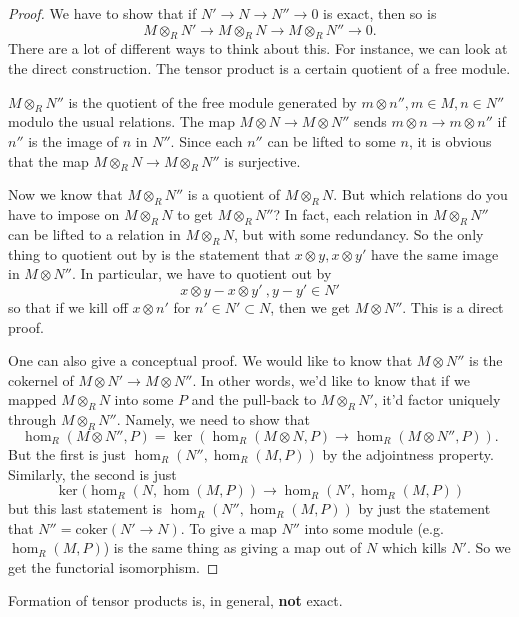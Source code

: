\begin{proof}
We have to show that if $N' \to N \to N'' \to 0$ is exact, then so is
\[ M \otimes_R N' \to M \otimes_R N \to M \otimes_R N'' \to 0.	\]
There are a lot of different ways to think about this. For instance, we can
look at the direct construction.  The tensor product is a certain quotient of a
free module.

$M \otimes_R N''$ is the quotient of the free module generated by $m \otimes
n'', m \in M, n \in N''$ modulo the usual relations.  The map $M \otimes N \to
M \otimes N''$ sends $m \otimes n \to m \otimes n''$ if $n'' $ is the image of
$n$ in $N''$. Since each $n''$ can be lifted to some $n$, it is obvious that
the map $M \otimes_R N \to M \otimes_R N''$ is surjective.

Now we know that $M \otimes_R N''$ is a quotient of $M \otimes_R N$. But which
relations do you have to impose on $M \otimes_R N$ to get $M \otimes_R
N''$? In fact, each relation in $M \otimes_R N''$
can be lifted to a relation in $M \otimes_R N$, but with some redundancy. So
the only thing to quotient
out by is the statement that $x \otimes y, x \otimes y'$ have the same image in
$M \otimes N''$.  In particular, we have to quotient out by
\[ x \otimes y - x\otimes y' \ , y - y' \in N'	 \]
so that if we kill off $x \otimes n'$ for $n' \in N' \subset N$, then we get $M
\otimes N''$. This is a direct proof.

One can also give a conceptual proof.  We would like to know that $M \otimes N''$
is the cokernel of $M \otimes N' \to M \otimes N''$. In other words, we'd like
to know that if we mapped $M \otimes_R N$ into some $P$ and the pull-back to $M
\otimes_R N'$, it'd factor uniquely through $M \otimes_R N''$.
Namely, we need to show that
\[ \hom_R(M \otimes N'', P) = \ker(\hom_R(M \otimes N, P) \to \hom_R(M
\otimes N'', P)).  \]
But the first is just $\hom_R(N'', \hom_R(M,P))$ by the adjointness property.
Similarly, the second is just
\[ \ker( \hom_R(N, \hom(M,P)) \to \hom_R(N', \hom_R(M,P))  \]
but this last statement is $\hom_R(N'', \hom_R(M,P))$ by just the statement
that $N'' = \mathrm{coker}(N ' \to N)$.
To give a map $N'' $ into some module (e.g. $\hom_R(M,P)$) is the same thing as
giving a map out of $N$ which kills $N'$.
So we get the functorial isomorphism.
\end{proof}

\begin{remark}
Formation of tensor products is, in general, \textbf{not} exact.
\end{remark}

